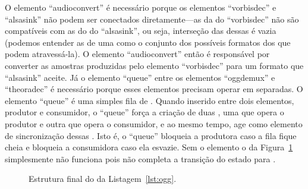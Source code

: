 \documentclass{SBCbookchapter}
\begin{document}
O elemento ``audioconvert'' é necessário porque os elementos ``vorbisdec'' e
``alsasink'' não podem ser conectados diretamente---as  da
 do ``vorbisdec'' não são compatíveis com as  do
 do ``alsasink'', ou seja, interseção das  dessas
 é vazia (podemos entender as  de uma  como o
conjunto dos possíveis formatos dos  que podem atravessá-la).
O elemento ``audioconvert'' então é responsável por converter as amostras
produzidas pelo elemento ``vorbisdec'' para um formato que ``alsasink'' aceite.
Já o elemento ``queue'' entre os elementos ``oggdemux'' e ``theoradec'' é
necessário porque esses elementos precisam operar em 
separadas.  O elemento ``queue'' é uma simples fila de .  Quando
inserido entre dois elementos, produtor e consumidor, o ``queue'' força a
criação de duas , uma que opera o produtor e outra que
opera o consumidor, e ao mesmo tempo, age como elemento de sincronização
dessas .  Isto é, o ``queue'' bloqueia a  produtora
caso a fila fique cheia e bloqueia a  consumidora caso ela
esvazie.  Sem o elemento  o  da
Figura~\ref{fig:pipe-ogg} simplesmente não funciona pois não completa a
transição do estado  para .

\begin{figure}[H]
  \centering
  \caption{Estrutura final do  da Listagem~\ref{lst:ogg}.}
  \label{fig:pipe-ogg}
\end{figure}
\end{document}
